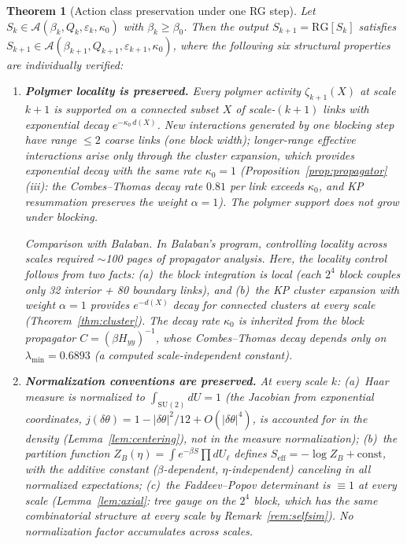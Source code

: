 \documentclass[11pt]{article}
\newtheorem{theorem}{Theorem}[section]
\theoremstyle{definition}
\newcommand{\SU}{\mathrm{SU}}
\begin{document}
\begin{theorem}[Action class preservation under one RG step]%
\label{thm:class-preserve}
Let $S_k\in\mathcal{A}(\beta_k,Q_k,\varepsilon_k,\kappa_0)$
with $\beta_k\ge\beta_0$.  Then the output
$S_{k+1}=\mathrm{RG}[S_k]$ satisfies
$S_{k+1}\in\mathcal{A}(\beta_{k+1},Q_{k+1},\varepsilon_{k+1},\kappa_0)$,
where the following six structural properties are
\emph{individually verified}:

\begin{enumerate}[nosep,label=(S\arabic*)]
\item \textbf{Polymer locality is preserved.}
Every polymer activity $\zeta_{k+1}(X)$ at scale $k{+}1$
is supported on a connected subset $X$ of scale-$(k{+}1)$
links with exponential decay $e^{-\kappa_0\,d(X)}$.
New interactions generated by one blocking step have range
$\le 2$ coarse links (one block width); longer-range
effective interactions arise only through the cluster
expansion, which provides exponential decay with the
same rate $\kappa_0=1$
(Proposition~\ref{prop:propagator}(iii): the
Combes--Thomas decay rate $0.81$ per link exceeds $\kappa_0$,
and KP resummation preserves the weight $\alpha=1$).
The polymer support does not grow under blocking.

\emph{Comparison with Balaban.}
In Balaban's program, controlling locality across scales
required $\sim$100 pages of propagator analysis.  Here,
the locality control follows from two facts:
(a)~the block integration is local (each $2^4$ block
couples only 32 interior + 80 boundary links), and
(b)~the KP cluster expansion with weight $\alpha=1$
provides $e^{-d(X)}$ decay for connected clusters at
every scale (Theorem~\ref{thm:cluster}).  The decay rate
$\kappa_0$ is inherited from the block propagator
$C=(\beta H_{yy})^{-1}$, whose Combes--Thomas decay
depends only on $\lambda_{\min}=0.6893$ (a computed
scale-independent constant).

\item \textbf{Normalization conventions are preserved.}
At every scale $k$: (a)~Haar measure is normalized to
$\int_{\SU(2)}dU=1$ (the Jacobian from exponential
coordinates, $j(\delta\theta)=1-|\delta\theta|^2/12
+O(|\delta\theta|^4)$, is accounted for in the density
(Lemma~\ref{lem:centering}), not in the measure
normalization); (b)~the partition function
$Z_B(\eta)=\int e^{-\beta S}\prod dU_\ell$ defines
$S_{\mathrm{eff}}=-\log Z_B+\mathrm{const}$, with the
additive constant ($\beta$-dependent, $\eta$-independent)
canceling in all normalized expectations; (c)~the
Faddeev--Popov determinant is $\equiv 1$ at every scale
(Lemma~\ref{lem:axial}: tree gauge on the $2^4$ block,
which has the same combinatorial structure at every scale
by Remark~\ref{rem:selfsim}).
No normalization factor accumulates across scales.


\end{enumerate}
\end{theorem}
\end{document}
